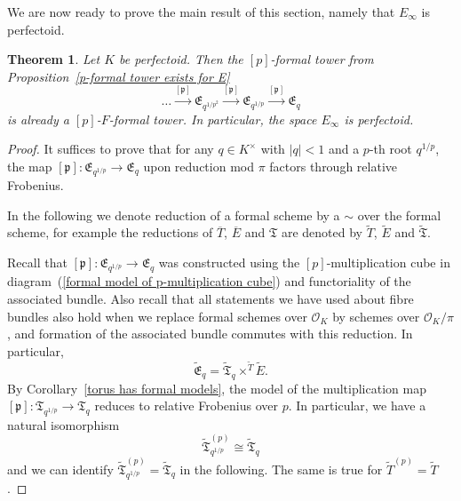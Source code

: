 \documentclass[10pt,oneside]{amsart}
\newtheorem{theorem}{Theorem}[section]
\theoremstyle{definition}
\begin{document}
	We are now ready to prove the main result of this section, namely that $E_\infty$ is perfectoid.
	\begin{theorem}\label{p-F-formal tower exists for E}
		Let $K$ be perfectoid. Then the $[p]$-formal tower from Proposition~\ref{p-formal tower exists for E}
		\[\dots \xrightarrow{[\mathfrak p]} \mathfrak E_{q^{1/p^2}}\xrightarrow{[\mathfrak p]} \mathfrak E_{q^{1/p}}\xrightarrow{[\mathfrak p]} \mathfrak E_q\]
		 is already a $[p]$-$F$-formal tower.
		In particular, the space $E_\infty$ is perfectoid.
	\end{theorem}
	\begin{proof}
	
	It suffices to prove that for any $q\in K^\times$ with $|q|<1$ and a $p$-th root $q^{1/p}$, the map $[\mathfrak p]:\mathfrak E_{q^{1/p}}\xrightarrow{} \mathfrak E_q$ upon reduction mod $\pi$ factors through relative Frobenius.
	
	In the following we denote reduction of a formal scheme by a $\sim$ over the formal scheme, for example the reductions of $\overline{T}$, $\overline{E}$ and $\mathfrak T$ are denoted by $\tilde{T}$, $\tilde{E}$ and $\tilde{\mathfrak{T}}$.
	
		
	Recall that $[\mathfrak p]:\mathfrak E_{q^{1/p}}\xrightarrow{} \mathfrak E_q$ was constructed using the $[p]$-multiplication cube in diagram~(\ref{formal model of p-multiplication cube}) and functoriality of the associated bundle. 	
	Also recall that all statements we have used about fibre bundles also hold when we replace formal schemes over $\mathcal O_K$ by schemes over $\mathcal O_K/\pi$, and formation of the associated bundle commutes with this reduction. In particular,
	\[\tilde{\mathfrak{E}}_q = \tilde{\mathfrak T}_q\times^{\tilde{T}}\tilde E.\]
	By  Corollary~\ref{torus has formal models}, the model of the multiplication map $[\mathfrak p]:\mathfrak T_{q^{1/p}} \rightarrow \mathfrak T_{q}$ reduces to relative Frobenius over $p$. In particular, we have a natural isomorphism
	\[\tilde{\mathfrak T}_{q^{1/p}}^{(p)} \cong \tilde{\mathfrak T}_{q}\]
	and we can identify $\tilde{\mathfrak T}_{q^{1/p}}^{(p)} = \tilde{\mathfrak T}_{q}$ in the following. The same is true for $\tilde{T}^{(p)} = \tilde{T}$.
	

\end{proof}
\end{document}
